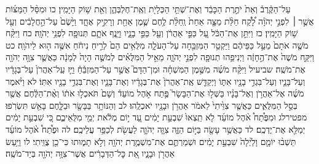 \documentclass[twoside, openany, parskip=half, 11pt]{book}
\begin{document}
עַל־הַקֶּ֒רֶב֒ וְאֵת֙ יֹתֶ֣רֶת הַכָּבֵ֔ד וְאֶת־שְׁתֵּ֥י הַכְּלָיֹ֖ת וְאֶֽת־חֶלְבְּהֶ֑ן וְאֵ֖ת שׁ֥וֹק הַיָּמִֽין׃ כו וּמִסַּ֨ל הַמַּצּ֜וֹת אֲשֶׁ֣ר ׀ לִפְנֵ֣י יְהֹוָ֗ה לָ֠קַ֠ח חַלַּ֨ת מַצָּ֤ה אַחַת֙ וְֽחַלַּ֨ת לֶ֥חֶם שֶׁ֛מֶן אַחַ֖ת וְרָקִ֣יק אֶחָ֑ד וַיָּ֙שֶׂם֙ עַל־הַ֣חֲלָבִ֔ים וְעַ֖ל שׁ֥וֹק הַיָּמִֽין׃ כז וַיִּתֵּ֣ן אֶת־הַכֹּ֔ל עַ֚ל כַּפֵּ֣י אַהֲרֹ֔ן וְעַ֖ל כַּפֵּ֣י בָנָ֑יו וַיָּ֧נֶף אֹתָ֛ם תְּנוּפָ֖ה לִפְנֵ֥י יְהֹוָֽה׃ כח וַיִּקַּ֨ח מֹשֶׁ֤ה אֹתָם֙ מֵעַ֣ל כַּפֵּיהֶ֔ם וַיַּקְטֵ֥ר הַמִּזְבֵּ֖חָה עַל־הָעֹלָ֑ה מִלֻּאִ֥ים הֵם֙ לְרֵ֣יחַ נִיחֹ֔חַ אִשֶּׁ֥ה ה֖וּא לַיהֹוָֽה׃ כט וַיִּקַּ֤ח מֹשֶׁה֙ אֶת־הֶ֣חָזֶ֔ה וַיְנִיפֵ֥הוּ תְנוּפָ֖ה לִפְנֵ֣י יְהֹוָ֑ה מֵאֵ֣יל הַמִּלֻּאִ֗ים לְמֹשֶׁ֤ה הָיָה֙ לְמָנָ֔ה כַּאֲשֶׁ֛ר צִוָּ֥ה יְהֹוָ֖ה אֶת־מֹשֶֽׁה׃ שביעיל וַיִּקַּ֨ח מֹשֶׁ֜ה מִשֶּׁ֣מֶן הַמִּשְׁחָ֗ה וּמִן־הַדָּם֮ אֲשֶׁ֣ר עַל־הַמִּזְבֵּ֒חַ֒ וַיַּ֤ז עַֽל־אַהֲרֹן֙ עַל־בְּגָדָ֔יו וְעַל־בָּנָ֛יו וְעַל־בִּגְדֵ֥י בָנָ֖יו אִתּ֑וֹ וַיְקַדֵּ֤שׁ אֶֽת־אַהֲרֹן֙ אֶת־בְּגָדָ֔יו וְאֶת־בָּנָ֛יו וְאֶת־בִּגְדֵ֥י בָנָ֖יו אִתּֽוֹ׃ לא וַיֹּ֨אמֶר מֹשֶׁ֜ה אֶל־אַהֲרֹ֣ן וְאֶל־בָּנָ֗יו בַּשְּׁל֣וּ אֶת־הַבָּשָׂר֮ פֶּ֣תַח אֹ֣הֶל מוֹעֵד֒ וְשָׁם֙ תֹּאכְל֣וּ אֹת֔וֹ וְאֶ֨ת־הַלֶּ֔חֶם אֲשֶׁ֖ר בְּסַ֣ל הַמִּלֻּאִ֑ים כַּאֲשֶׁ֤ר צִוֵּ֙יתִי֙ לֵאמֹ֔ר אַהֲרֹ֥ן וּבָנָ֖יו יֹאכְלֻֽהוּ׃ לב וְהַנּוֹתָ֥ר בַּבָּשָׂ֖ר וּבַלָּ֑חֶם בָּאֵ֖שׁ תִּשְׂרֹֽפוּ׃ מפטירלג וּמִפֶּ֩תַח֩ אֹ֨הֶל מוֹעֵ֜ד לֹ֤א תֵֽצְאוּ֙ שִׁבְעַ֣ת יָמִ֔ים עַ֚ד י֣וֹם מְלֹ֔את יְמֵ֖י מִלֻּאֵיכֶ֑ם כִּ֚י שִׁבְעַ֣ת יָמִ֔ים יְמַלֵּ֖א אֶת־יֶדְכֶֽם׃ לד כַּאֲשֶׁ֥ר עָשָׂ֖ה בַּיּ֣וֹם הַזֶּ֑ה צִוָּ֧ה יְהֹוָ֛ה לַעֲשֹׂ֖ת לְכַפֵּ֥ר עֲלֵיכֶֽם׃ לה וּפֶ֩תַח֩ אֹ֨הֶל מוֹעֵ֜ד תֵּשְׁב֨וּ יוֹמָ֤ם וָלַ֙יְלָה֙ שִׁבְעַ֣ת יָמִ֔ים וּשְׁמַרְתֶּ֛ם אֶת־מִשְׁמֶ֥רֶת יְהֹוָ֖ה וְלֹ֣א תָמ֑וּתוּ כִּי־כֵ֖ן צֻוֵּֽיתִי׃ לו וַיַּ֥עַשׂ אַהֲרֹ֖ן וּבָנָ֑יו אֵ֚ת כׇּל־הַדְּבָרִ֔ים אֲשֶׁר־צִוָּ֥ה יְהֹוָ֖ה בְּיַד־מֹשֶֽׁה׃
\end{document}

